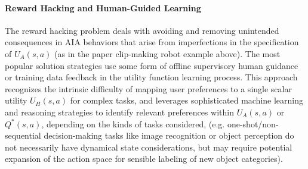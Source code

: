 \paragraph{Reward Hacking and Human-Guided Learning}
The reward hacking problem deals with avoiding and removing unintended consequences in AIA behaviors that arise from imperfections in the specification of $U_A(s,a)$ (as in the paper clip-making robot example above). 
The most popular solution strategies use some form of offline supervisory human guidance or training data feedback in the utility function learning process. 
This approach recognizes the intrinsic difficulty of mapping user preferences to a single scalar utility $U_H(s,a)$ for complex tasks, and leverages sophisticated machine learning and reasoning strategies to identify relevant preferences within $U_A(s,a)$ or $Q^*(s,a)$, depending on the kinds of tasks considered, (e.g. one-shot/non-sequential decision-making tasks like image recognition or object perception do not necessarily have dynamical state considerations, but may require potential expansion of the action space for sensible labeling of new object categories). 


